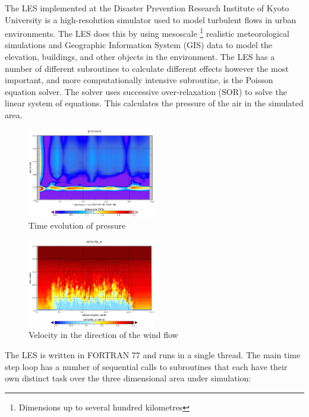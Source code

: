 The LES implemented at the Disaster Prevention Research Institute of Kyoto
University is a high-resolution simulator used to model turbulent flows in urban
environments. The LES does this by using mesoscale \footnote{Dimensions up to
several hundred kilometres} realistic meteorological simulations and Geographic
Information System (GIS) data to model the elevation, buildings, and other
objects in the environment. The LES has a number of different subroutines to
calculate different effects however the most important, and more computationally
intensive subroutine, is the Poisson equation solver. The solver uses successive
over-relaxation (SOR) to solve the linear system of equations. This calculates
the pressure of the air in the simulated area.

\begin{figure}
    \includegraphics[width=0.5\textwidth]{graphs/pressure_in_LES_output_p.png}
    \caption{Time evolution of pressure}
    \label{fig:lespressure}
\end{figure}

\begin{figure}
    \includegraphics[width=0.5\textwidth]{graphs/velocity_x_in_LES_output_u.png}
    \caption{Velocity in the direction of the wind flow}
    \label{fig:lesvelocity}
\end{figure}

The LES is written in FORTRAN 77 and runs in a single thread. The main time step
loop has a number of sequential calls to subroutines that each have their own
distinct task over the three dimensional area under simulation:

